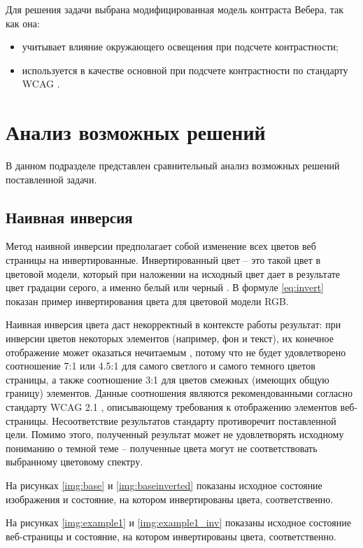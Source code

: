 Для решения задачи выбрана модифицированная модель контраста Вебера, так как она:

\begin{itemize}
	\item учитывает влияние окружающего освещения при подсчете контрастности;
	\item используется в качестве основной при подсчете контрастности по стандарту WCAG \cite{wcag}.
\end{itemize}

\section{Анализ возможных решений}

В данном подразделе представлен сравнительный анализ возможных решений поставленной задачи.

\subsection{Наивная инверсия}

Метод наивной инверсии предполагает собой изменение всех цветов веб страницы на инвертированные. Инвертированный цвет -- это такой цвет в цветовой модели, который при наложении на исходный цвет дает в результате цвет градации серого, а именно белый или черный \cite{complementary}. В формуле \ref{eq:invert} показан пример инвертирования цвета для цветовой модели RGB.

Наивная инверсия цвета даст некорректный в контексте работы результат: при инверсии цветов некоторых элементов (например, фон и текст), их конечное отображение может оказаться нечитаемым \cite{invbad}, потому что не будет удовлетворено соотношение 7:1 или 4.5:1 \cite{wcag1} для самого светлого и самого темного цветов страницы, а также соотношение 3:1 \cite{wcag2} для цветов смежных (имеющих общую границу) элементов. Данные соотношения являются рекомендованными согласно стандарту WCAG 2.1 \cite{wcag}, описывающему требования к отображению элементов веб-страницы. Несоответствие результатов стандарту противоречит поставленной цели. Помимо этого, полученный результат может не удовлетворять исходному пониманию о темной теме -- полученные цвета могут не соответствовать выбранному цветовому спектру. 

На рисунках \ref{img:base} и \ref{img:baseinverted} показаны исходное состояние изображения и состояние, на котором инвертированы цвета, соответственно.

На рисунках \ref{img:example1} и \ref{img:example1_inv} показаны исходное состояние веб-страницы и состояние, на котором инвертированы цвета, соответственно.

